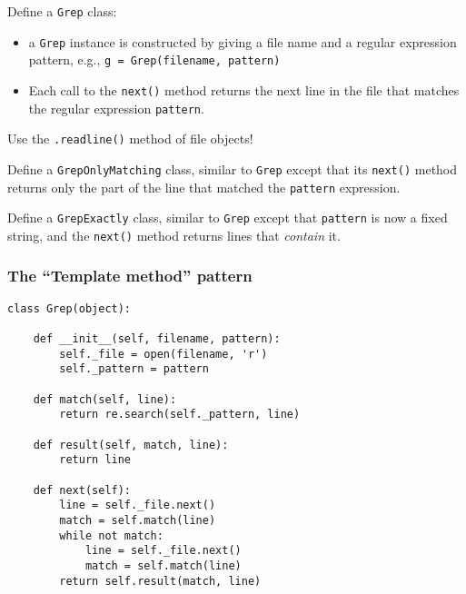 \documentclass[english,serif,mathserif,xcolor=pdftex,dvipsnames,table]{beamer}
\begin{document}
\begin{frame}[fragile]
  \begin{exercise}
    Define a \texttt{Grep} class:
    \begin{itemize}
    \item a \texttt{Grep} instance is constructed by giving a file name and a regular expression pattern, e.g., \lstinline|g = Grep(filename, pattern)|
    \item Each call to the \texttt{next()} method returns the next line in the file that matches the regular expression \texttt{pattern}.
    \end{itemize}

    Use the \texttt{.readline()} method of file objects!
  \end{exercise}

  \+
  \begin{exercise}
    Define a \texttt{GrepOnlyMatching} class, similar to \texttt{Grep}
    except that its \texttt{next()} method returns only the part of
    the line that matched the \texttt{pattern} expression.
  \end{exercise}

  \+
  \begin{exercise}
    Define a \texttt{GrepExactly} class, similar to \texttt{Grep}
    except that \texttt{pattern} is now a fixed string, and the
    \texttt{next()} method returns lines that \emph{contain} it.
  \end{exercise}
\end{frame}


\begin{frame}[fragile]
  \frametitle{The ``Template method'' pattern}
\begin{lstlisting}
class Grep(object):

    def __init__(self, filename, pattern):
        self._file = open(filename, 'r')
        self._pattern = pattern

    def match(self, line):
        return re.search(self._pattern, line)

    def result(self, match, line):
        return line

    def next(self):
        line = self._file.next()
        match = self.match(line)
        while not match:
            line = self._file.next()
            match = self.match(line)
        return self.result(match, line)
\end{lstlisting}
\end{frame}
\end{document}
